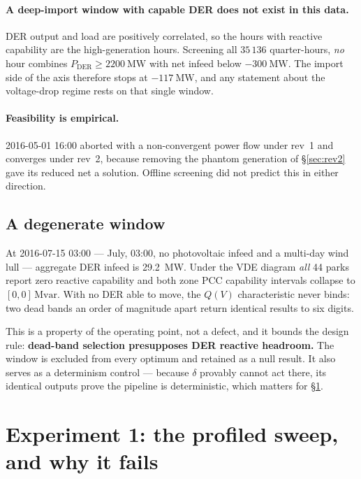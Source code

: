 \documentclass[11pt,a4paper]{article}
\newcommand{\Mvar}{\ensuremath{\mathrm{Mvar}}}
\newcommand{\dz}{\ensuremath{\delta}}
\begin{document}
\paragraph{A deep-import window with capable DER does not exist in this data.}
DER output and load are positively correlated, so the hours with reactive
capability are the high-generation hours. Screening all $35\,136$ quarter-hours,
\emph{no} hour combines $P_\mathrm{DER}\geq\SI{2200}{\mega\watt}$ with net
infeed below $-\SI{300}{\mega\watt}$. The import side of the axis therefore
stops at $-\SI{117}{\mega\watt}$, and any statement about the voltage-drop
regime rests on that single window.

\paragraph{Feasibility is empirical.} 2016-05-01 16:00 aborted with a
non-convergent power flow under rev~1 and converges under rev~2, because
removing the phantom generation of \S\ref{sec:rev2} gave its reduced net a
solution. Offline screening did not predict this in either direction.

\subsection{A degenerate window}
\label{sec:degenerate}

At 2016-07-15 03:00 --- July, 03:00, no photovoltaic infeed and a multi-day wind
lull --- aggregate DER infeed is \SI{29.2}{\mega\watt}. Under the VDE diagram
\emph{all} 44 parks report zero reactive capability and both zone PCC capability
intervals collapse to $[0,0]\,\si{\Mvar}$. With no DER able to move, the $Q(V)$
characteristic never binds: two dead bands an order of magnitude apart return
identical results to six digits.

This is a property of the operating point, not a defect, and it bounds the
design rule: \textbf{dead-band selection presupposes DER reactive headroom.}
The window is excluded from every optimum and retained as a null result. It also
serves as a determinism control --- because $\dz$ provably cannot act there,
its identical outputs prove the pipeline is deterministic, which matters for
\S\ref{sec:sweep}.

\section{Experiment 1: the profiled sweep, and why it fails}
\label{sec:sweep}
\end{document}
